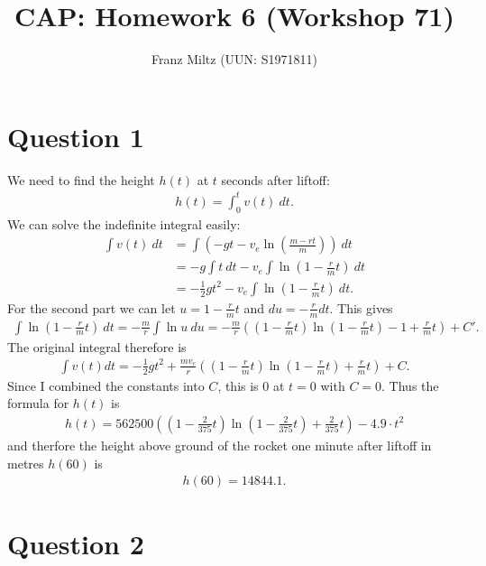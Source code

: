 \documentclass{article}
\title{CAP: Homework 6 (Workshop 71)}
\author{Franz Miltz (UUN: S1971811)}
\begin{document}
\maketitle
\section*{Question 1}
We need to find the height $h(t)$ at $t$ seconds after liftoff:
\begin{align*}
	h(t) = \int_0^t v(t)\: dt.
\end{align*}
We can solve the indefinite integral easily:
\begin{align*}
	\int v(t)\:dt & = \int \left(-gt -v_e \ln \left(\frac{m-rt}{m}\right)\right)\:dt \\
	              & = -g \int t\: dt -v_e \int \ln\left(1-\frac{r}{m}t\right)\: dt   \\
	              & =-\frac{1}{2}gt^2-v_e \int \ln\left(1-\frac{r}{m}t\right)\:dt.
\end{align*}
For the second part we can let $u=1-\frac{r}{m}t$  and  $du = -\frac{r}{m}dt$. This gives
\begin{align*}
	\int\ln\left(1-\frac{r}{m}t\right)\: dt = -\frac{m}{r}\int \ln u\: du = -\frac{m}{r}\left(\left(1-\frac{r}{m}t\right)\ln\left(1-\frac{r}{m}t\right)-1+\frac{r}{m}t\right)+C'.
\end{align*}
The original integral therefore is
\begin{align*}
	\int v(t)dt =-\frac{1}{2}gt^2+\frac{mv_e}{r}\left(\left(1-\frac{r}{m}t\right)\ln\left(1-\frac{r}{m}t\right)+\frac{r}{m}t\right)+C.
\end{align*}
Since I combined the constants into $C$, this is $0$ at $t=0$ with $C=0$. Thus the formula for $h(t)$ is
\begin{align*}
	h(t)=562500\left(\left(1-\frac{2}{375}t\right)\ln\left(1-\frac{2}{375}t\right)+\frac{2}{375}t\right) -4.9\cdot t^2
\end{align*}
and therfore the height above ground of the rocket one minute after liftoff in metres $h(60)$ is
\begin{align*}
	h(60)=14844.1.
\end{align*}
\section*{Question 2}
\end{document}
